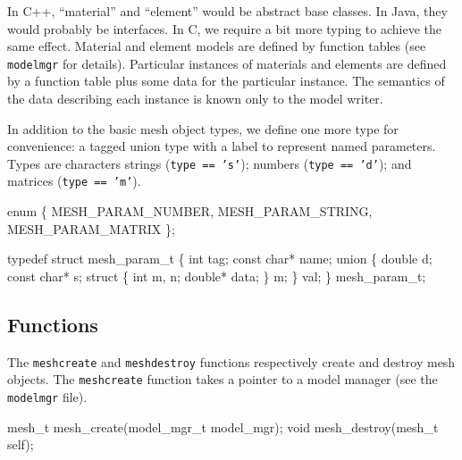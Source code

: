 \nwendcode{}\nwdocspar

In C++, ``material'' and ``element'' would be abstract base classes.
In Java, they would probably be interfaces.  In C, we require a bit
more typing to achieve the same effect.  Material and element models are
defined by function tables (see {\tt{}modelmgr} for details).  Particular
instances of materials and elements are defined by a function table plus
some data for the particular instance.  The semantics of the data
describing each instance is known only to the model writer.

In addition to the basic mesh object types, we define one more type
for convenience: a tagged union type with a label to represent
named parameters.  Types are characters strings ({\tt{}type\ ==\ 's'});
numbers ({\tt{}type\ ==\ 'd'}); and matrices ({\tt{}type\ ==\ 'm'}).

\nwenddocs{}\plusendmoddef
enum \{
    MESH_PARAM_NUMBER,
    MESH_PARAM_STRING,
    MESH_PARAM_MATRIX
\};

typedef struct mesh_param_t \{
    int tag;
    const char* name;
    union \{
        double d;
        const char* s;
        struct \{
            int m, n;
            double* data;
        \} m;
    \} val;
\} mesh_param_t;

\nwendcode{}\nwdocspar


\subsection{Functions}

The {\tt{}mesh{}create} and {\tt{}mesh{}destroy} functions respectively
create and destroy mesh objects.
The {\tt{}mesh{}create} function takes a pointer to a model manager
(see the {\tt{}modelmgr} file).

\nwenddocs{}\endmoddef
mesh_t mesh_create(model_mgr_t model_mgr);
void   mesh_destroy(mesh_t self);

\nwendcode{}\nwdocspar


